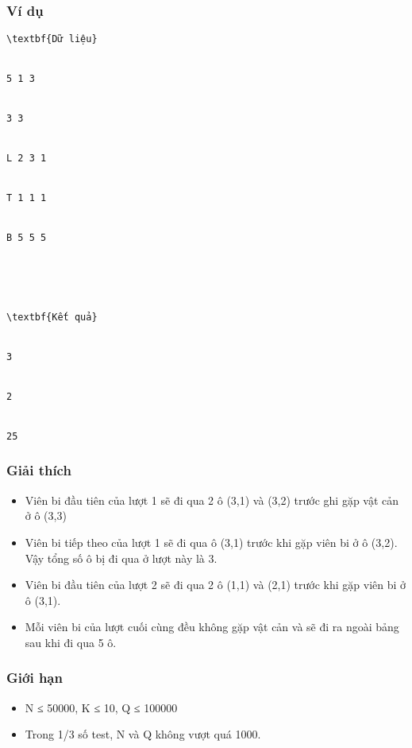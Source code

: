 \subsubsection{   Ví dụ  }
\begin{verbatim}
\textbf{Dữ liệu}


5 1 3


3 3


L 2 3 1


T 1 1 1


B 5 5 5





\textbf{Kết quả}


3


2


25\end{verbatim}

\subsubsection{   Giải thích  }
\begin{itemize}
	\item     Viên bi đầu tiên của lượt 1 sẽ đi qua 2 ô (3,1) và (3,2) trước ghi gặp vật cản ở ô (3,3)   
	\item     Viên bi tiếp theo của lượt 1 sẽ đi qua ô (3,1) trước khi gặp viên bi ở ô (3,2). Vậy tổng số ô bị đi qua ở lượt này là 3.   
	\item     Viên bi đầu tiên của lượt 2 sẽ đi qua 2 ô (1,1) và (2,1) trước khi gặp viên bi ở ô (3,1).   
	\item     Mỗi viên bi của lượt cuối cùng đều không gặp vật cản và sẽ đi ra ngoài bảng sau khi đi qua 5 ô.   
\end{itemize}

\subsubsection{   Giới hạn  }
\begin{itemize}
	\item     N ≤ 50000, K ≤ 10, Q ≤ 100000   
	\item     Trong 1/3 số test, N và Q không vượt quá 1000.   
\end{itemize}


